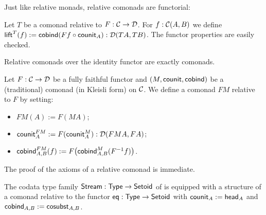 \documentclass[envcountsame]{llncs}
\begin{document}
\begin{Long}
Just like relative monads, relative comonads are functorial:
\begin{definition}%
\label{def:lift}
 Let $T$ be a  comonad relative to $F:\C\to\D$.
 For $f : \C(A,B)$ we define
  $ \lift^T(f) := \cobind(\comp{\counit_A}{Ff}) : \D(TA,TB)$. 
 The functor properties are easily checked.
\end{definition}
\end{Long}

\begin{Long}
Relative comonads over the identity functor are exactly comonads.
\end{Long}



\begin{Long}

\begin{example}\label{ex_relcom_from_com}
  Let $F : \C \to \D$ be a fully faithful functor and $(M,\counit,\cobind)$ be a (traditional) comonad (in Kleisli form) on $\C$.
  We define a comonad $FM$ relative to $F$ by setting:
  \begin{itemize}
   \item $FM(A) := F(MA)$;
   \item $\counit^{FM}_A := F(\counit^M_A) : \D(FMA,FA)$;
   \item $\cobind^{FM}_{A,B} (f) := F\bigl(\cobind^M_{A,B}(F^{-1}f)\bigr)$.
  \end{itemize}
  The proof of the axioms of a relative comonad is immediate.
\end{example}

\end{Long}

\begin{example}[Streams]\label{ex_stream_comonad}
  The codata type family $\stream : \Set \to \Setoid$ of  is equipped with a structure of a comonad relative to the functor 
  $\eq : \Set \to \Setoid$ with
   $\counit_A := \shead_A$ and
   $\cobind_{A,B} := \sredec_{A,B}$.
\end{example}
\end{document}
